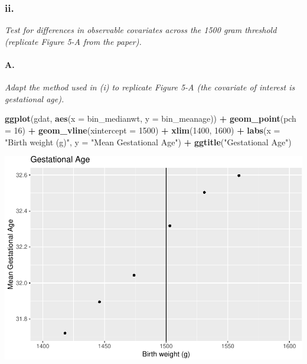 \documentclass[
]{article}
\newenvironment{Shaded}{\begin{snugshade}}{\end{snugshade}}
\newcommand{\DataTypeTok}[1]{\textcolor[rgb]{0.13,0.29,0.53}{#1}}
\newcommand{\DecValTok}[1]{\textcolor[rgb]{0.00,0.00,0.81}{#1}}
\newcommand{\KeywordTok}[1]{\textcolor[rgb]{0.13,0.29,0.53}{\textbf{#1}}}
\newcommand{\NormalTok}[1]{#1}
\newcommand{\OperatorTok}[1]{\textcolor[rgb]{0.81,0.36,0.00}{\textbf{#1}}}
\newcommand{\StringTok}[1]{\textcolor[rgb]{0.31,0.60,0.02}{#1}}
\begin{document}
\hypertarget{ii.}{%
\subsubsection{ii.}\label{ii.}}

\textit{Test for differences in observable covariates across the 1500 gram threshold (replicate Figure
5-A from the paper).}

\hypertarget{a.-2}{%
\paragraph{A.}\label{a.-2}}

\textit{Adapt the method used in (i) to replicate Figure 5-A (the covariate of interest is gestational age).}

\begin{Shaded}
\begin{Highlighting}[]
\KeywordTok{ggplot}\NormalTok{(gdat, }\KeywordTok{aes}\NormalTok{(}\DataTypeTok{x =}\NormalTok{ bin_medianwt, }\DataTypeTok{y =}\NormalTok{ bin_meanage)) }\OperatorTok{+}
\StringTok{  }\KeywordTok{geom_point}\NormalTok{(}\DataTypeTok{pch =} \DecValTok{16}\NormalTok{) }\OperatorTok{+}
\StringTok{  }\KeywordTok{geom_vline}\NormalTok{(}\DataTypeTok{xintercept =} \DecValTok{1500}\NormalTok{) }\OperatorTok{+}
\StringTok{  }\KeywordTok{xlim}\NormalTok{(}\DecValTok{1400}\NormalTok{, }\DecValTok{1600}\NormalTok{) }\OperatorTok{+}\StringTok{ }
\StringTok{  }\KeywordTok{labs}\NormalTok{(}\DataTypeTok{x =} \StringTok{"Birth weight (g)"}\NormalTok{, }\DataTypeTok{y =} \StringTok{"Mean Gestational Age"}\NormalTok{) }\OperatorTok{+}
\StringTok{  }\KeywordTok{ggtitle}\NormalTok{(}\StringTok{"Gestational Age"}\NormalTok{)}
\end{Highlighting}
\end{Shaded}

\includegraphics{Pset2_files/figure-latex/unnamed-chunk-6-1.pdf}
\end{document}
